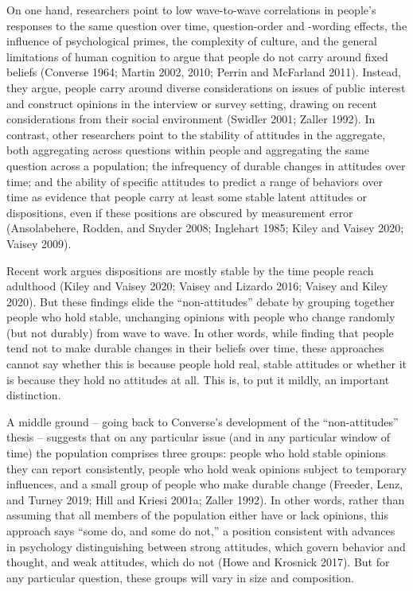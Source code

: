 \documentclass[12pt,]{article}
\begin{document}
On one hand, researchers point to low wave-to-wave correlations in people's responses to the same question over time, question-order and -wording effects, the influence of psychological primes, the complexity of culture, and the general limitations of human cognition to argue that people do not carry around fixed beliefs (Converse 1964; Martin 2002, 2010; Perrin and McFarland 2011). Instead, they argue, people carry around diverse considerations on issues of public interest and construct opinions in the interview or survey setting, drawing on recent considerations from their social environment (Swidler 2001; Zaller 1992). In contrast, other researchers point to the stability of attitudes in the aggregate, both aggregating across questions within people and aggregating the same question across a population; the infrequency of durable changes in attitudes over time; and the ability of specific attitudes to predict a range of behaviors over time as evidence that people carry at least some stable latent attitudes or dispositions, even if these positions are obscured by measurement error (Ansolabehere, Rodden, and Snyder 2008; Inglehart 1985; Kiley and Vaisey 2020; Vaisey 2009).

Recent work argues dispositions are mostly stable by the time people reach adulthood (Kiley and Vaisey 2020; Vaisey and Lizardo 2016; Vaisey and Kiley 2020). But these findings elide the ``non-attitudes'' debate by grouping together people who hold stable, unchanging opinions with people who change randomly (but not durably) from wave to wave. In other words, while finding that people tend not to make durable changes in their beliefs over time, these approaches cannot say whether this is because people hold real, stable attitudes or whether it is because they hold no attitudes at all. This is, to put it mildly, an important distinction.

A middle ground -- going back to Converse's development of the ``non-attitudes'' thesis -- suggests that on any particular issue (and in any particular window of time) the population comprises three groups: people who hold stable opinions they can report consistently, people who hold weak opinions subject to temporary influences, and a small group of people who make durable change (Freeder, Lenz, and Turney 2019; Hill and Kriesi 2001a; Zaller 1992). In other words, rather than assuming that all members of the population either have or lack opinions, this approach says ``some do, and some do not,'' a position consistent with advances in psychology distinguishing between strong attitudes, which govern behavior and thought, and weak attitudes, which do not (Howe and Krosnick 2017). But for any particular question, these groups will vary in size and composition.
\end{document}
